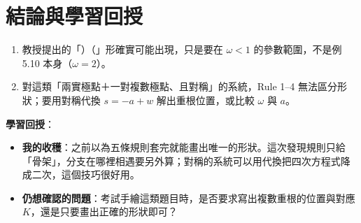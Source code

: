 \documentclass[11pt,a4paper]{article}
\begin{document}
\section{結論與學習回授}
\begin{recipebox}[結論]
\begin{enumerate}
  \item 教授提出的「）（」形確實可能出現，只是要在 $\omega<1$ 的參數範圍，不是例 5.10 本身（$\omega=2$）。
  \item 對這類「兩實極點＋一對複數極點、且對稱」的系統，Rule 1--4 無法區分形狀；要用對稱代換 $s=-a+w$ 解出重根位置，或比較 $\omega$ 與 $a$。
\end{enumerate}
\end{recipebox}

\textbf{學習回授}：
\begin{itemize}[leftmargin=1.5em]
  \item \textbf{我的收穫}：之前以為五條規則套完就能畫出唯一的形狀。這次發現規則只給「骨架」，分支在哪裡相遇要另外算；對稱的系統可以用代換把四次方程式降成二次，這個技巧很好用。
  \item \textbf{仍想確認的問題}：考試手繪這類題目時，是否要求寫出複數重根的位置與對應 $K$，還是只要畫出正確的形狀即可？
\end{itemize}
\end{document}
